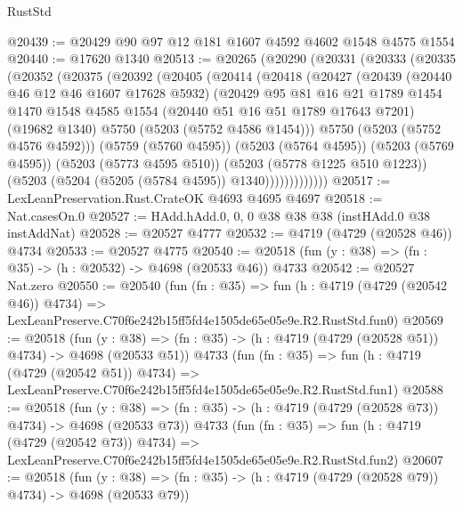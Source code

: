 \begin{lexlean}{RustStd}
\begin{coremodule}
@20439 := @20429 @90 @97 @12 @181 @1607 @4592 @4602 @1548 @4575 @1554
@20440 := @17620 @1340
@20513 := @20265
    (@20290
      (@20331
        (@20333
          (@20335
            (@20352
              (@20375
                (@20392
                  (@20405
                    (@20414
                      (@20418
                        (@20427
                          (@20439
                            (@20440 @46 @12 @46 @1607 @17628 @5932)
                            (@20429
                              @95
                              @81
                              @16
                              @21
                              @1789
                              @1454
                              @1470
                              @1548
                              @4585
                              @1554
                              (@20440 @51 @16 @51 @1789 @17643 @7201)
                              (@19682 @1340)
                              @5750
                              (@5203 (@5752 @4586 @1454)))
                            @5750
                            (@5203 (@5752 @4576 @4592)))
                          (@5759 (@5760 @4595))
                          (@5203 (@5764 @4595))
                          (@5203 (@5769 @4595))
                          (@5203 (@5773 @4595 @510))
                          (@5203 (@5778 @1225 @510 @1223))
                          (@5203 (@5204 (@5205 (@5784 @4595)) @1340)))))))))))))
@20517 := LexLeanPreservation.Rust.CrateOK @4693 @4695 @4697
@20518 := Nat.casesOn.{0}
@20527 := HAdd.hAdd.{0, 0, 0} @38 @38 @38 (instHAdd.{0} @38 instAddNat)
@20528 := @20527 @4777
@20532 := @4719 (@4729 (@20528 @46)) @4734
@20533 := @20527 @4775
@20540 := @20518 (fun (y : @38) => (fn : @35) -> (h : @20532) -> @4698 (@20533 @46)) @4733
@20542 := @20527 Nat.zero
@20550 := @20540
    (fun (fn : @35) =>
    fun (h : @4719 (@4729 (@20542 @46)) @4734) =>
    LexLeanPreserve.C70f6e242b15ff5fd4e1505de65e05e9e.R2.RustStd.fun0)
@20569 := @20518
    (fun (y : @38) => (fn : @35) -> (h : @4719 (@4729 (@20528 @51)) @4734) -> @4698 (@20533 @51))
    @4733
    (fun (fn : @35) =>
    fun (h : @4719 (@4729 (@20542 @51)) @4734) =>
    LexLeanPreserve.C70f6e242b15ff5fd4e1505de65e05e9e.R2.RustStd.fun1)
@20588 := @20518
    (fun (y : @38) => (fn : @35) -> (h : @4719 (@4729 (@20528 @73)) @4734) -> @4698 (@20533 @73))
    @4733
    (fun (fn : @35) =>
    fun (h : @4719 (@4729 (@20542 @73)) @4734) =>
    LexLeanPreserve.C70f6e242b15ff5fd4e1505de65e05e9e.R2.RustStd.fun2)
@20607 := @20518
    (fun (y : @38) => (fn : @35) -> (h : @4719 (@4729 (@20528 @79)) @4734) -> @4698 (@20533 @79))

\end{coremodule}
\end{lexlean}
